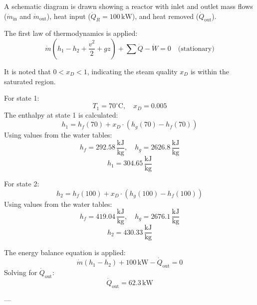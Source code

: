 A schematic diagram is drawn showing a reactor with inlet and outlet mass flows (\( \dot{m}_{\text{in}} \) and \( \dot{m}_{\text{out}} \)), heat input (\( \dot{Q}_R = 100 \, \text{kW} \)), and heat removed (\( \dot{Q}_{\text{out}} \)).  

The first law of thermodynamics is applied:  
\[
\dot{m} (h_1 - h_2 + \frac{v^2}{2} + gz) + \sum \dot{Q} - \dot{W} = 0 \quad \text{(stationary)}
\]  

It is noted that \( 0 < x_D < 1 \), indicating the steam quality \( x_D \) is within the saturated region.  

For state 1:  
\[
T_1 = 70^\circ\text{C}, \quad x_D = 0.005
\]  
The enthalpy at state 1 is calculated:  
\[
h_1 = h_f(70) + x_D \cdot (h_g(70) - h_f(70))
\]  
Using values from the water tables:  
\[
h_f = 292.58 \, \frac{\text{kJ}}{\text{kg}}, \quad h_g = 2626.8 \, \frac{\text{kJ}}{\text{kg}}
\]  
\[
h_1 = 304.65 \, \frac{\text{kJ}}{\text{kg}}
\]  

For state 2:  
\[
h_2 = h_f(100) + x_D \cdot (h_g(100) - h_f(100))
\]  
Using values from the water tables:  
\[
h_f = 419.04 \, \frac{\text{kJ}}{\text{kg}}, \quad h_g = 2676.1 \, \frac{\text{kJ}}{\text{kg}}
\]  
\[
h_2 = 430.33 \, \frac{\text{kJ}}{\text{kg}}
\]  

The energy balance equation is applied:  
\[
\dot{m} (h_1 - h_2) + 100 \, \text{kW} - \dot{Q}_{\text{out}} = 0
\]  
Solving for \( \dot{Q}_{\text{out}} \):  
\[
\dot{Q}_{\text{out}} = 62.3 \, \text{kW}
\]  

---
